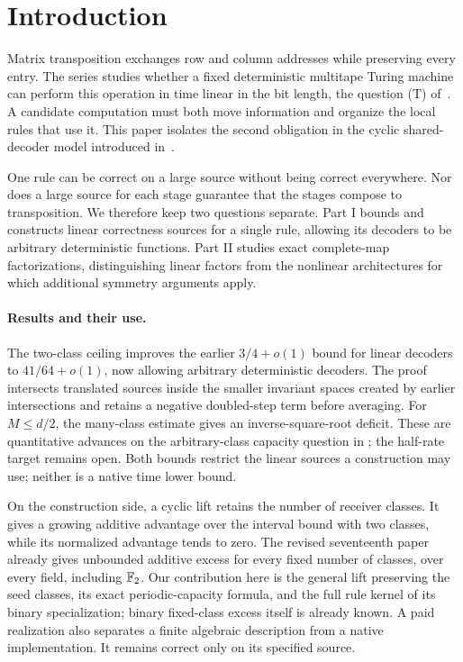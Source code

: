 \section{Introduction}\label{sec:introduction}
Matrix transposition exchanges row and column addresses while preserving every
entry. The series studies whether a fixed deterministic multitape Turing machine
can perform this operation in time linear in the bit length, the question
\textup{(T)} of~\cite{FirstPaper2026}. A candidate computation must both move
information and organize the local rules that use it. This paper isolates the
second obligation in the cyclic shared-decoder model introduced
in~\cite{SeventeenthPaper2026}.

One rule can be correct on a large source without being correct everywhere.
Nor does a large source for each stage guarantee that the stages compose to
transposition. We therefore keep two questions separate. Part I bounds and
constructs linear correctness sources for a single rule, allowing its decoders
to be arbitrary deterministic functions. Part II studies exact complete-map
factorizations, distinguishing linear factors from the nonlinear architectures
for which additional symmetry arguments apply.

\paragraph{Results and their use.}
The two-class ceiling improves the earlier $3/4+o(1)$ bound for linear
decoders to $41/64+o(1)$, now allowing arbitrary deterministic decoders.
The proof intersects translated sources inside the smaller invariant spaces
created by earlier intersections and retains a negative doubled-step term
before averaging. For $M\le d/2$, the many-class estimate gives an
inverse-square-root deficit. These are quantitative advances on the arbitrary-class
capacity question in \cite[Problem~9.1(a)]{SeventeenthPaper2026}; the half-rate
target remains open. Both bounds restrict the linear sources a construction
may use; neither is a native time lower bound.

On the construction side, a cyclic lift retains the number of receiver classes.
It gives a growing additive advantage over the interval bound with two classes,
while its normalized advantage tends to zero. The revised seventeenth paper
already gives unbounded additive excess for every fixed number of classes,
over every field, including $\mathbb{F}_2$\cite{SeventeenthPaper2026}.
Our contribution here is the general lift preserving the seed classes,
its exact periodic-capacity formula, and the full rule kernel of its binary
specialization; binary fixed-class excess itself is already known.
A paid realization also separates a finite algebraic description from a native
implementation. It remains correct only on its specified source.

